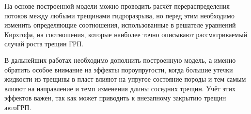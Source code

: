 На основе построенной модели можно проводить расчёт перераспределения потоков между любыми трещинами гидроразрыва, но перед этим необходимо изменить определяющие соотношения, использованные в решателе уравнений Кирхгофа, на соотношения, которые наиболее точно описывают рассматриваемый случай роста трещин ГРП.

В дальнейших работах необходимо дополнить построенную модель, а именно обратить особое внимание на эффекты пороупругости, когда большие утечки жидкости из трещины в пласт влияют на упругое состояние породы и тем самым влияют на направление и темп изменения длины соседних трещин.
Учёт этих эффектов важен, так как может приводить к внезапному закрытию трещин автоГРП.





